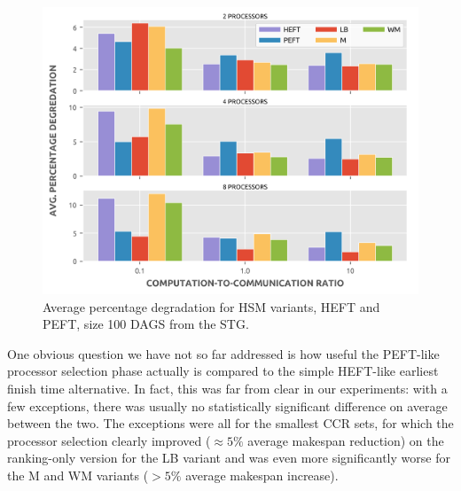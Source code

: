 \documentclass[12pt]{article}
\begin{document}
\begin{figure}
	\centering	
	\includegraphics[scale=0.8]{100tasks_apd.png}
	\caption{Average percentage degradation for HSM variants, HEFT and PEFT, size 100 DAGS from the STG.}	
	\label{plot.selection_apd_100}
\end{figure}

One obvious question we have not so far addressed is how useful the PEFT-like processor selection phase actually is compared to the simple HEFT-like earliest finish time alternative. In fact, this was far from clear in our experiments: with a few exceptions, there was usually no statistically significant difference on average between the two. The exceptions were all for the smallest CCR sets, for which the processor selection clearly improved ($\approx 5\%$ average makespan reduction) on the ranking-only version for the LB variant and was even more significantly worse for the M and WM variants ($> 5\%$ average makespan increase).  


%




\end{document}
